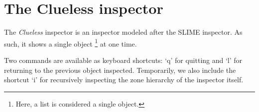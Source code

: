 \chapter{The Clueless inspector}

The \emph{Clueless} inspector is an inspector modeled after the SLIME
inspector.  As such, it shows a single object%
\footnote{Here, a list is considered a single object.}
at one time.

Two commands are available as keyboard shortcuts: `q' for quitting and
`l' for returning to the previous object inspected.  Temporarily, we
also include the shortcut `i' for recursively inspecting the zone
hierarchy of the inspector itself.  

